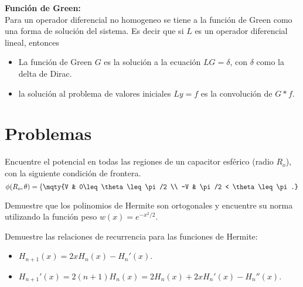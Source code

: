 \begin{mdframed}[style=warning]
	{\Large \textbf{Función de Green:}} \\
	Para un operador diferencial no homogeneo se tiene a la función de Green como una forma de solución del sistema. Es decir que si $L$ es un operador diferencial lineal, entonces
	\begin{itemize}
		\item La función de Green $G$ es la solución a la ecuación $LG = \delta$, con $\delta$ como la delta de Dirac.
		\item la solución al problema de valores iniciales $Ly = f$ es la convolución de $G\ast f$.
	\end{itemize}
\end{mdframed}









\pagebreak


\section*{Problemas}


\begin{ejercicio}
	Encuentre el potencial en todas las regiones de un capacitor esférico (radio $R_o$), con la siguiente condición de frontera.
		$$ \phi (R_o ,\theta) = \left\{ \mqty{V & 0\leq \theta \leq \pi /2 \\ -V & \pi/2 < \theta \leq \pi.} \right. $$
\end{ejercicio}












\begin{ejercicio}
	Demuestre que los polinomios de Hermite son ortogonales y encuentre su norma utilizando la función peso $w(x) = e^{-x^2 /2}$.
\end{ejercicio}














\begin{ejercicio}
	Demuestre las relaciones de recurrencia para las funciones de Hermite:
	\begin{itemize}
		\item $H_{n + 1} (x) = 2xH_n (x) - H_n ' (x)$.
		\item $H_{n + 1} ' (x) = 2(n + 1) H_n (x) = 2H_n (x) + 2xH_n ' (x) - H_n '' (x)$.
	\end{itemize}
\end{ejercicio}













